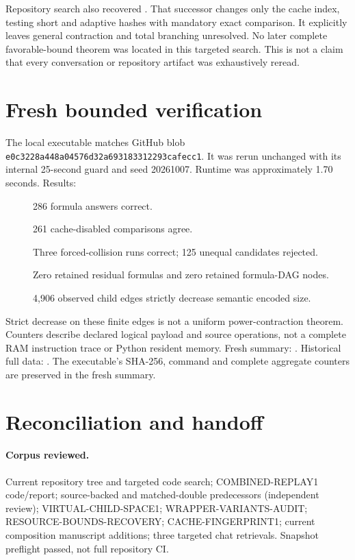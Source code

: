 \documentclass[11pt]{article}
\begin{document}
Repository search also recovered .
That successor changes only the cache index, testing short and adaptive hashes
with mandatory exact comparison. It explicitly leaves general contraction
and total branching unresolved. No later complete favorable-bound theorem was
located in this targeted search. This is not a claim that every conversation
or repository artifact was exhaustively reread.

\section{Fresh bounded verification}
The local executable matches GitHub blob
\texttt{e0c3228a448a04576d32a693183312293cafecc1}.
It was rerun unchanged with its internal 25-second guard and seed 20261007.
Runtime was approximately 1.70 seconds. Results:
\begin{description}
\item[] 286 formula answers correct.
\item[] 261 cache-disabled comparisons agree.
\item[] Three forced-collision runs correct; 125 unequal candidates rejected.
\item[] Zero retained residual formulas and zero retained formula-DAG nodes.
\item[] 4,906 observed child edges strictly decrease semantic encoded size.
\end{description}
Strict decrease on these finite edges is not a uniform power-contraction
theorem. Counters describe declared logical payload and source operations,
not a complete RAM instruction trace or Python resident memory.
Fresh summary:
.
Historical full data:
.
The executable's SHA-256, command and complete aggregate counters are
preserved in the fresh summary.

\section{Reconciliation and handoff}
\paragraph{Corpus reviewed.}
Current repository tree and targeted code search; COMBINED-REPLAY1 code/report;
source-backed and matched-double predecessors (independent review);
VIRTUAL-CHILD-SPACE1; WRAPPER-VARIANTS-AUDIT; RESOURCE-BOUNDS-RECOVERY;
CACHE-FINGERPRINT1; current composition manuscript additions; three targeted
chat retrievals. Snapshot preflight passed, not full repository CI.
\end{document}

